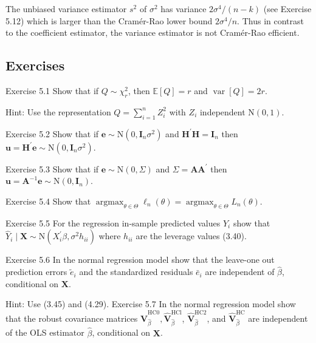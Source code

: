 \documentclass[10pt]{article}
\begin{document}
The unbiased variance estimator $s^{2}$ of $\sigma^{2}$ has variance $2 \sigma^{4} /(n-k)$ (see Exercise 5.12) which is larger than the Cramér-Rao lower bound $2 \sigma^{4} / n$. Thus in contrast to the coefficient estimator, the variance estimator is not Cramér-Rao efficient.

\subsection{Exercises}
Exercise 5.1 Show that if $Q \sim \chi_{r}^{2}$, then $\mathbb{E}[Q]=r$ and $\operatorname{var}[Q]=2 r$.

Hint: Use the representation $Q=\sum_{i=1}^{n} Z_{i}^{2}$ with $Z_{i}$ independent $\mathrm{N}(0,1)$.

Exercise 5.2 Show that if $\boldsymbol{e} \sim \mathrm{N}\left(0, \boldsymbol{I}_{n} \sigma^{2}\right)$ and $\boldsymbol{H}^{\prime} \boldsymbol{H}=\boldsymbol{I}_{n}$ then $\boldsymbol{u}=\boldsymbol{H}^{\prime} \boldsymbol{e} \sim \mathrm{N}\left(0, \boldsymbol{I}_{n} \sigma^{2}\right)$.

Exercise 5.3 Show that if $\boldsymbol{e} \sim \mathrm{N}(0, \Sigma)$ and $\Sigma=\boldsymbol{A} \boldsymbol{A}^{\prime}$ then $\boldsymbol{u}=\boldsymbol{A}^{-1} \boldsymbol{e} \sim \mathrm{N}\left(0, \boldsymbol{I}_{n}\right)$.

Exercise 5.4 Show that $\operatorname{argmax}_{\theta \in \Theta} \ell_{n}(\theta)=\operatorname{argmax}_{\theta \in \Theta} L_{n}(\theta)$.

Exercise 5.5 For the regression in-sample predicted values $\widehat{Y}_{i}$ show that $\widehat{Y}_{i} \mid \boldsymbol{X} \sim \mathrm{N}\left(X_{i}^{\prime} \beta, \sigma^{2} h_{i i}\right)$ where $h_{i i}$ are the leverage values (3.40).

Exercise 5.6 In the normal regression model show that the leave-one out prediction errors $\widetilde{e}_{i}$ and the standardized residuals $\bar{e}_{i}$ are independent of $\widehat{\beta}$, conditional on $\boldsymbol{X}$.

Hint: Use (3.45) and (4.29). Exercise 5.7 In the normal regression model show that the robust covariance matrices $\widehat{\boldsymbol{V}}_{\widehat{\beta}}^{\mathrm{HC} 0}, \widehat{\boldsymbol{V}}_{\widehat{\beta}}^{\mathrm{HCl}}$, $\widehat{\boldsymbol{V}}_{\widehat{\beta}}^{\mathrm{HC} 2}$, and $\widehat{\boldsymbol{V}}_{\widehat{\beta}}^{\mathrm{HC}}$ are independent of the OLS estimator $\widehat{\beta}$, conditional on $\boldsymbol{X}$.
\end{document}
